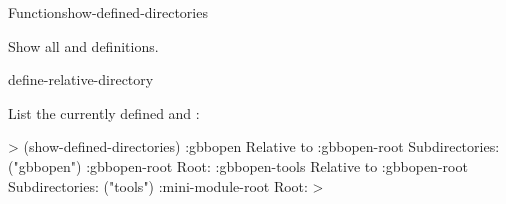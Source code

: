 \documentclass[10pt,twoside,english,pdftex]{article}
\begin{document}
\begin{functiondoc}{Function}{show-defined-directories}{\noargs}
%
%

\fnsyntax

\fnpurpose Show all  and  definitions.

\fnpackage {}

\fnmodule {}

\begin{alsos}{define-relative-directory}
\end{alsos}

\fnexample 
%
List the currently defined  and :
%
\begin{example}
%
\W\supp
  > (show-defined-directories)
  :gbbopen
      Relative to :gbbopen-root
      Subdirectories: ("gbbopen")
  :gbbopen-root
      Root: 
  :gbbopen-tools
      Relative to :gbbopen-root
      Subdirectories: ("tools")
  :mini-module-root
      Root: 
  >
\end{example}

\end{functiondoc}

\end{document}
